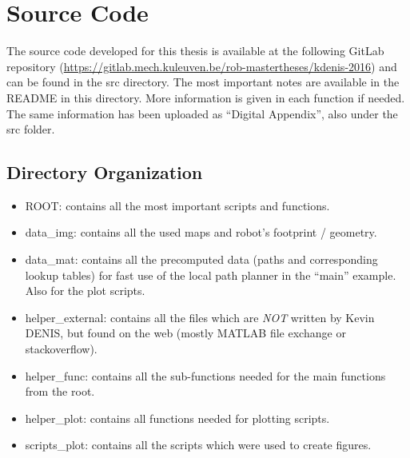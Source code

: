 \chapter{Source Code}\label{app:SourceCode}
The source code developed for this thesis is available at the following GitLab repository \cite{Denis2017} (\url{https://gitlab.mech.kuleuven.be/rob-mastertheses/kdenis-2016}) and can be found in the src directory. The most important notes are available in the README in this directory. More information is given in each function if needed. The same information has been uploaded as ``Digital Appendix'', also under the src folder. 

\section{Directory Organization}
\begin{itemize}
\tightlist
\item ROOT: contains all the most important scripts and functions.
\item data\_img: contains all the used maps and robot's footprint / geometry.
\item data\_mat: contains all the precomputed data (paths and corresponding lookup tables) for fast use of the local path planner in  the ``main'' example. Also for the plot scripts.
\item helper\_external:  contains all the files which are \emph{NOT} written by Kevin DENIS, but found on the web (mostly MATLAB file exchange or stackoverflow).
\item helper\_func: contains all the sub-functions needed for the main functions from the root.
\item helper\_plot: contains all functions needed for plotting scripts.
\item scripts\_plot: contains all the scripts which were used to create  figures.
\end{itemize}